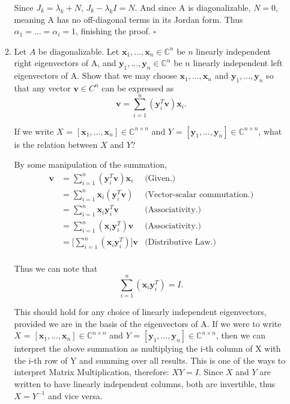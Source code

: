 \documentclass[12pt]{article}
\newcommand{\jump}{\vspace{5mm}}
\newcommand{\C}{\mathbb{C}}
\newcommand{\lm}{\lambda}
\begin{document}
\begin{enumerate}[leftmargin=\labelsep]
\begin{enumerate}
Since $J_k = \lm_k + N$, $J_k - \lm_kI = N$. And since A is diagonalizable, $N = 0$, meaning A has no off-diagonal terms in its Jordan form. Thus  $\alpha_1 = ... = \alpha_i = 1$, finishing the proof. $\square$

\jump
\item Let $A$ be diagonalizable. Let $\textbf{x}_1, ..., \textbf{x}_n \in \C^n$ be $n$ linearly independent right eigenvectors of A, and $\textbf{y}_1, ..., \textbf{y}_n \in \C^n$ be $n$ linearly independent left eigenvectors of A. Show that we may choose $\textbf{x}_1, ..., \textbf{x}_n$ and $\textbf{y}_1, ..., \textbf{y}_n$ so that any vector $\textbf{v} \in C^n$ can be expressed as 
\[
\textbf{v} = \sum_{i = 1}^n(\textbf{y}^T_i\textbf{v})\textbf{x}_i.
\]

If we write $X$ = $[\textbf{x}_1, ..., \textbf{x}_n] \in \C^{n\times n}$ and $Y$ = $[\textbf{y}_1, ..., \textbf{y}_n] \in \C^{n\times n}$, what is the relation between $X$ and $Y$?

By some manipulation of the summation, 
\begin{align*}
    \textbf{v} &= \sum_{i = 1}^n(\textbf{y}^T_i\textbf{v})\textbf{x}_i &\text{(Given.)} \\
    &= \sum_{i = 1}^n\textbf{x}_i(\textbf{y}^T_i\textbf{v}) &\text{(Vector-scalar commutation.)}\\
    &= \sum_{i = 1}^n\textbf{x}_i\textbf{y}^T_i\textbf{v} &\text{(Associativity.)}\\
    &= \sum_{i = 1}^n(\textbf{x}_i\textbf{y}^T_i)\textbf{v} &\text{(Associativity.)}\\
    &= \bigg[\sum_{i = 1}^n(\textbf{x}_i\textbf{y}^T_i)\bigg]\textbf{v} &\text{(Distributive Law.)}\\
\end{align*}

Thus we can note that 
\[
\sum_{i = 1}^n(\textbf{x}_i\textbf{y}^T_i) = I.
\]

This should hold for any choice of linearly independent eigenvectors, provided we are in the basis of the eigenvectors of A. If we were to write $X$ = $[\textbf{x}_1, ..., \textbf{x}_n] \in \C^{n\times n}$ and $Y$ = $[\textbf{y}_1, ..., \textbf{y}_n] \in \C^{n\times n}$, then we can interpret the above summation as multiplying the i-th column of X with the i-th row of Y and summing over all results. This is one of the ways to interpret Matrix Multiplication, therefore: $XY = I$. Since $X$ and $Y$ are written to have linearly independent columns, both are invertible, thus $X = Y^{-1}$ and vice versa.
\end{enumerate}

\end{enumerate}
\end{document}
